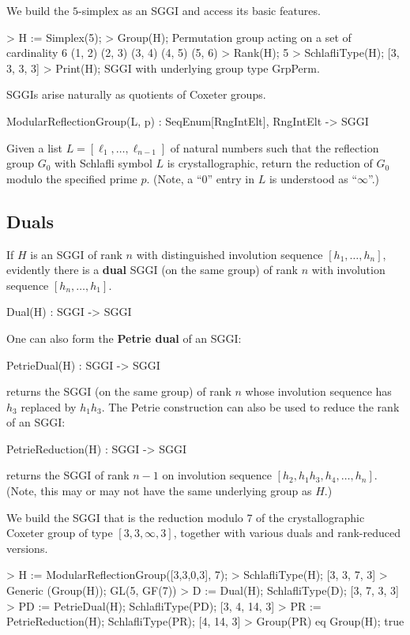 \documentclass{documentation}
\begin{document}
\begin{example}[Simplex]
We build the $5$-simplex as an SGGI and access its basic features.
\begin{code}
> H := Simplex(5);
> Group(H);
Permutation group acting on a set of cardinality 6
   (1, 2)
   (2, 3)
   (3, 4)
   (4, 5)
   (5, 6)
> Rank(H);
5
> SchlafliType(H);
[3, 3, 3, 3]
> Print(H);
SGGI with underlying group type GrpPerm.
\end{code}
\end{example}

SGGIs arise naturally as quotients of Coxeter groups.
\begin{intrinsics}
ModularReflectionGroup(L, p) : SeqEnum[RngIntElt], RngIntElt -> SGGI
\end{intrinsics}
Given a list $L=[\ell_1,\ldots,\ell_{n-1}]$ of natural numbers such that the reflection group $G_0$
with Schlafli symbol $L$ is crystallographic, return the reduction of $G_0$ modulo
the specified prime $p$. (Note, a ``0'' entry in $L$ is understood as ``$\infty$''.)

\subsection{Duals}
\label{sec:duals}
If $H$ is an SGGI of rank $n$ with distinguished involution sequence $[h_1,\ldots,h_n]$, evidently there is a {\bf dual}
SGGI (on the same group) of rank $n$ with involution sequence $[h_n,\ldots,h_1]$.
\begin{intrinsics}
Dual(H) : SGGI -> SGGI
\end{intrinsics}
One can also form the {\bf Petrie dual} of an SGGI:
\begin{intrinsics}
PetrieDual(H) : SGGI -> SGGI
\end{intrinsics}
returns the SGGI (on the same group) of rank $n$ whose involution sequence has $h_3$ replaced by $h_1h_3$.
The Petrie construction can also be used to reduce the rank of an SGGI:
\begin{intrinsics}
PetrieReduction(H) : SGGI -> SGGI
\end{intrinsics}
returns the SGGI of rank $n-1$ on involution sequence $[h_2,h_1h_3,h_4,\ldots,h_n]$. (Note, this may or may not 
have the same underlying group as $H$.)

\begin{example}
We build the SGGI that is the reduction modulo 7 of the crystallographic Coxeter group of type $[3,3,\infty,3]$,
together with various duals and rank-reduced versions.
\begin{code}
> H := ModularReflectionGroup([3,3,0,3], 7);
> SchlafliType(H);
[3, 3, 7, 3]
> Generic (Group(H));
GL(5, GF(7))
> D := Dual(H); SchlafliType(D);
[3, 7, 3, 3]
> PD := PetrieDual(H); SchlafliType(PD);
[3, 4, 14, 3]
> PR := PetrieReduction(H); SchlafliType(PR); 
[4, 14, 3]
> Group(PR) eq Group(H);
true
\end{code}
\end{example}
\end{document}
